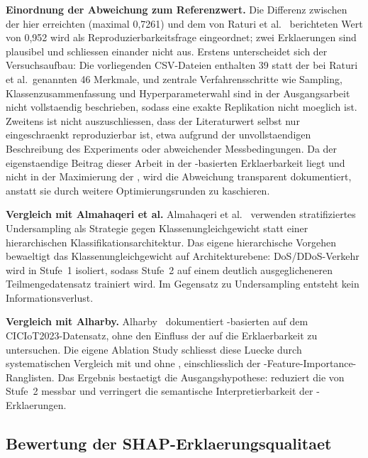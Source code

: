 \textbf{Einordnung der Abweichung zum Referenzwert.}
Die Differenz zwischen der hier erreichten \ba{} (maximal 0{,}7261) und dem von Raturi et al.\
\cite{raturi2026exploratory} berichteten Wert von 0{,}952 wird als Reproduzierbarkeitsfrage
eingeordnet; zwei Erklaerungen sind plausibel und schliessen einander nicht aus.
Erstens unterscheidet sich der Versuchsaufbau: Die vorliegenden CSV-Dateien enthalten 39 statt
der bei Raturi et al.\ genannten 46 Merkmale, und zentrale Verfahrensschritte wie Sampling,
Klassenzusammenfassung und Hyperparameterwahl sind in der Ausgangsarbeit nicht vollstaendig
beschrieben, sodass eine exakte Replikation nicht moeglich ist.
Zweitens ist nicht auszuschliessen, dass der Literaturwert selbst nur eingeschraenkt
reproduzierbar ist, etwa aufgrund der unvollstaendigen Beschreibung des Experiments oder
abweichender Messbedingungen.
Da der eigenstaendige Beitrag dieser Arbeit in der \shap{}-basierten Erklaerbarkeit liegt und
nicht in der Maximierung der \ba{}, wird die Abweichung transparent dokumentiert, anstatt sie
durch weitere Optimierungsrunden zu kaschieren.

\textbf{Vergleich mit Almahaqeri et al.}
Almahaqeri et al.\ \cite{almahaqeri2026gradient} verwenden stratifiziertes Undersampling
als Strategie gegen Klassenungleichgewicht statt einer hierarchischen
Klassifikationsarchitektur.
Das eigene hierarchische Vorgehen bewaeltigt das Klassenungleichgewicht auf Architekturebene:
DoS/DDoS-Verkehr wird in Stufe~1 isoliert, sodass Stufe~2 auf einem deutlich
ausgeglicheneren Teilmengedatensatz trainiert wird.
Im Gegensatz zu Undersampling entsteht kein Informationsverlust.

\textbf{Vergleich mit Alharby.}
Alharby~\cite{alharby2025ciciot} dokumentiert \pca{}-basierten \gb{} auf dem
CICIoT2023-Datensatz, ohne den Einfluss der \pca{} auf die Erklaerbarkeit zu untersuchen.
Die eigene Ablation Study schliesst diese Luecke durch systematischen Vergleich mit und
ohne \pca{}, einschliesslich der \shap{}-Feature-Importance-Ranglisten.
Das Ergebnis bestaetigt die Ausgangshypothese: \pca{} reduziert die \ba{} von Stufe~2
messbar und verringert die semantische Interpretierbarkeit der \shap{}-Erklaerungen.

\subsection{Bewertung der SHAP-Erklaerungsqualitaet}

